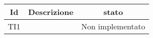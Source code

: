 \begin{center}
	\begin{longtable}{|c|>{\centering}m{7cm}|c|}\hline
		Id & Descrizione & stato \\ \hline
		TI1 &  & Non implementato \\ \hline
	\end{longtable}
\end{center}
